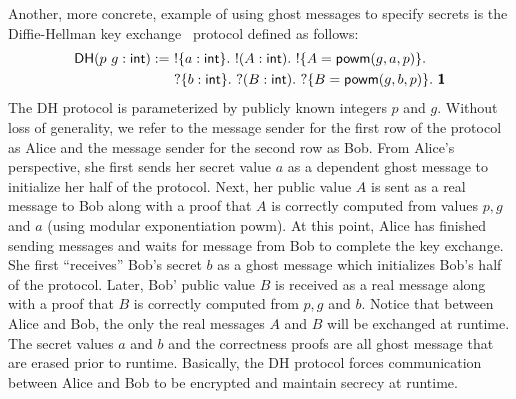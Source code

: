 Another, more concrete, example of using ghost messages to specify secrets is the
Diffie-Hellman key exchange~\cite{DH76} protocol defined as follows:
\begin{align*}
  \textsf{DH}(p\ g: \textsf{int})
  :=\ & !\{a: \textsf{int}\}.\ !(A: \textsf{int}).\ !\{A = \textsf{powm}(g, a, p)\}.\\
      & ?\{b: \textsf{int}\}.\ ?(B: \textsf{int}).\ ?\{B = \textsf{powm}(g, b, p)\}.\ \textbf{\textsf{1}}
\end{align*}
The \textsf{DH} protocol is parameterized by publicly known integers $p$ and $g$.
Without loss of generality, we refer to the message sender for the first row of the
protocol as Alice and the message sender for the second row as Bob. From Alice's
perspective, she first sends her secret value $a$ as a dependent ghost message to
initialize her half of the protocol. Next, her public value $A$ is sent as a real
message to Bob along with a proof that $A$ is correctly computed from values $p, g$ and $a$
(using modular exponentiation \textsf{powm}). At this point, Alice has finished sending
messages and waits for message from Bob to complete the key exchange. She first
``receives'' Bob's secret $b$ as a ghost message which initializes Bob's half of the
protocol. Later, Bob' public value $B$ is received as a real message along with a proof
that $B$ is correctly computed from $p, g$ and $b$. Notice that between Alice and Bob,
the only the real messages $A$ and $B$ will be exchanged at runtime. The secret values
$a$ and $b$ and the correctness proofs are all ghost message that are erased prior to
runtime. Basically, the \textsf{DH} protocol forces communication between Alice and Bob
to be encrypted and maintain secrecy at runtime.

